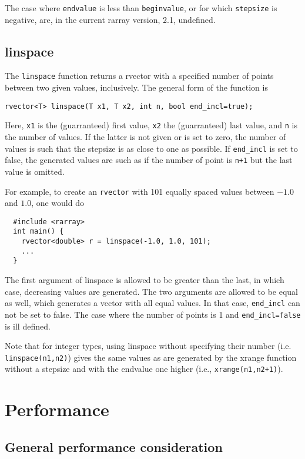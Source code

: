 \documentclass[11pt,twoside]{article}
\begin{document}
The case where \texttt{endvalue} is less than \texttt{beginvalue}, or
for which \texttt{stepsize} is negative, are, in the current rarray
version, 2.1, undefined.

\subsection{linspace}

The \texttt{linspace} function returns a rvector with a specified
number of points between two given values, inclusively.  The general
form of the function is
\begin{verbatim}
rvector<T> linspace(T x1, T x2, int n, bool end_incl=true);
\end{verbatim}
Here, \texttt{x1} is the (guarranteed) first value, \texttt{x2} the
(guarranteed) last value, and \texttt{n} is the number of values.  If
the latter is not given or is set to zero, the number of values is
such that the stepsize is as close to one as possible. If
\texttt{end\_incl} is set to false, the generated values are such as if
the number of point is \texttt{n+1} but the last value is omitted.

For example, to create an \texttt{rvector} with 101 equally spaced
values between $-1.0$ and $1.0$, one would do
\begin{verbatim}
  #include <rarray>
  int main() {
    rvector<double> r = linspace(-1.0, 1.0, 101);
    ...
  }
\end{verbatim}

The first argument of linspace is allowed to be greater than the last,
in which case, decreasing values are generated.  The two arguments are
allowed to be equal as well, which generates a vector with all equal values. In that case, \texttt{end\_incl} can not
be set to false. The case where the number of points is 1 and
\texttt{end\_incl=false} is ill defined.

Note that for integer types, using linspace without specifying their
number (i.e. \texttt{linspace(n1,n2)}) gives the same values as are
generated by the xrange function without a stepsize and with the
endvalue one higher (i.e., \texttt{xrange(n1,n2+1)}).


\section{Performance}

\subsection{General performance consideration}
\end{document}
